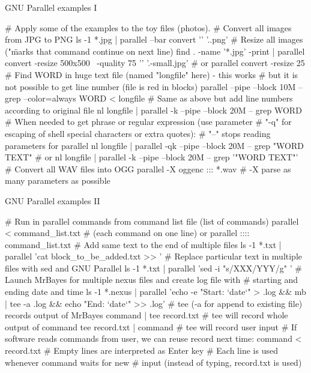 \documentclass[compress, ucs, xelatex, 11pt, xcolor=svgnames,
  hyperref={
    bookmarks=true,
    unicode=true,
    colorlinks=true,
    pdftitle={Linux, command line and MetaCentrum},
    plainpages=false,
    pdfauthor={Vojtech Zeisek},
    pdfsubject={Course about use of Linux command line, writing shell scripts and using MetaCentrum of CESNET},
    pdfcreator={XeLaTeX},
    pdfkeywords={Linux, GNU, BASH, shell, command line, MetaCentrum},
    linkcolor=DarkRed,
    anchorcolor=DarkBlue,
    citecolor=Indigo,
    filecolor=NavyBlue,
    menucolor=DarkMagenta,
    urlcolor=DarkBlue,
    pdftex},
  url={hyphens, lowtilde} %
  ]{beamer}
\begin{document}
\begin{frame}[fragile]{GNU Parallel examples I}
  \begin{bashcode}
    # Apply some of the examples to the toy files (photos).
    # Convert all images from JPG to PNG
    ls -1 *.jpg | parallel --bar convert '{}' '{.}.png'
    # Resize all images ("\" marks that command continue on next line)
    find . -name '*.jpg' -print | parallel convert -resize 500x500 \
      -quality 75 '{}' '{.}-small.jpg' # or
    parallel convert -resize 25%
    # Find WORD in huge text file (named "longfile" here) - this works
    # but it is not possible to get line number (file is red in blocks)
    parallel --pipe --block 10M -- grep --color=always WORD < longfile
    # Same as above but add line numbers according to original file
    nl longfile | parallel -k --pipe --block 20M -- grep WORD
    # When needed to get phrase or regular expression (use parameter
    # "-q" for escaping of shell special characters or extra quotes):
    # "--" stops reading parameters for parallel
    nl longfile | parallel -qk --pipe --block 20M -- grep "WORD TEXT" # or
    nl longfile | parallel -k --pipe --block 20M -- grep '"WORD TEXT"'
    # Convert all WAV files into OGG
    parallel -X oggenc ::: *.wav # -X parse as many parameters as possible
  \end{bashcode}
\end{frame}

\begin{frame}[fragile]{GNU Parallel examples II}
  \begin{bashcode}
    # Run in parallel commands from command list file (list of commands)
    parallel < command_list.txt # (each command on one line) or
    parallel :::: command_list.txt
    # Add same text to the end of multiple files
    ls -1 *.txt | parallel 'cat block_to_be_added.txt >> {}'
    # Replace particular text in multiple files with sed and GNU Parallel
    ls -1 *.txt | parallel 'sed -i "s/XXX/YYY/g" {}'
    # Launch MrBayes for multiple nexus files and create log file with
    # starting and ending date and time
    ls -1 *.nexus | parallel 'echo -e "Start: `date`\n" > {}.log && mb {} |
      tee -a {}.log && echo "End: `date`" >> {}.log'
    # tee (-a for append to existing file) records output of MrBayes
    command | tee record.txt # tee will record whole output of command
    tee record.txt | command # tee will record user input
    # If software reads commands from user, we can reuse record next time:
    command < record.txt # Empty lines are interpreted as Enter key
                         # Each line is used whenever command waits for new
                         # input (instead of typing, record.txt is used)
  \end{bashcode}
\end{frame}
\end{document}
